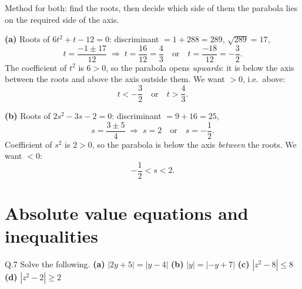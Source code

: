 \begin{solution}
Method for both: find the roots, then decide which side of them the parabola
lies on the required side of the axis.

\medskip
\textbf{(a)} Roots of $6t^{2}+t-12=0$: discriminant $=1+288=289$, $\sqrt{289}=17$,
\[
t=\frac{-1\pm 17}{12}
\;\Longrightarrow\;
t=\frac{16}{12}=\frac43 \quad\text{or}\quad t=\frac{-18}{12}=-\frac32 .
\]
The coefficient of $t^{2}$ is $6>0$, so the parabola opens \emph{upwards}: it is
below the axis between the roots and above the axis outside them. We want
$>0$, i.e.\ above:
\[
t<-\frac32 \quad\text{or}\quad t>\frac43 .
\]

\medskip
\textbf{(b)} Roots of $2s^{2}-3s-2=0$: discriminant $=9+16=25$,
\[
s=\frac{3\pm 5}{4} \;\Longrightarrow\; s=2 \quad\text{or}\quad s=-\frac12 .
\]
Coefficient of $s^{2}$ is $2>0$, so the parabola is below the axis
\emph{between} the roots. We want $<0$:
\[
-\frac12<s<2 .
\]

\end{solution}

\section{Absolute value equations and inequalities}

\begin{question}{Q.7}
Solve the following.
\textbf{(a)} $|2y+5|=|y-4|$ \quad
\textbf{(b)} $|y|=|-y+7|$ \quad
\textbf{(c)} $|z^{2}-8|\le 8$ \quad
\textbf{(d)} $|z^{2}-2|\ge 2$
\end{question}

